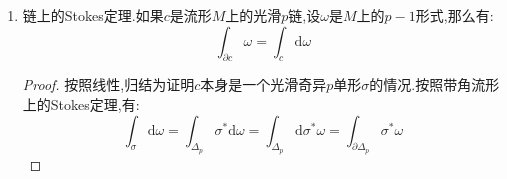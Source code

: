 \begin{enumerate}
\begin{proof}
    	最后我们证明过如果$G:\overline{D}\to\overline{E}$是光滑映射,限制在$D\to E$上是保定向或者反定向的微分同胚,那么有$\int_DG^*\omega=\pm\int_E\omega$,符号取决于这个限制是保定向还是反定向的.把这个结论用在$\varphi\circ F_i:A_i\to C_i$上得到:
    	$$\int_{C_i}(\varphi^{-1})^*\omega=\int_{A_i}(\varphi\circ F_i)^*(\varphi^{-1})^*\omega=\int_{A_i}F_i^*\omega=\int_{D_i}F_i^*\omega$$
    \end{proof}
	\item 链上的Stokes定理.如果$c$是流形$M$上的光滑$p$链,设$\omega$是$M$上的$p-1$形式,那么有:
	$$\int_{\partial c}\omega=\int_c\mathrm{d}\omega$$
	\begin{proof}
		
		按照线性,归结为证明$c$本身是一个光滑奇异$p$单形$\sigma$的情况.按照带角流形上的Stokes定理,有:
		$$\int_{\sigma}\mathrm{d}\omega=\int_{\Delta_p}\sigma^*\mathrm{d}\omega=\int_{\Delta_p}\mathrm{d}\sigma^*\omega=\int_{\partial\Delta_p}\sigma^*\omega$$
		

\end{proof}
\end{enumerate}
